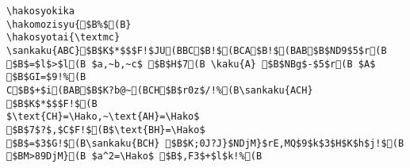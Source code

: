 \begin{verbatim}
\hakosyokika
\hakomozisyu{$B%$(B}
\hakosyotai{\textmc}
\sankaku{ABC}$B$K$*$$$F!$JU(BBC$B!$(BCA$B!$(BAB$B$ND9$5$r(B
$B$=$l$>$l(B $a,~b,~c$ $B$H$7(B \kaku{A} $B$NBg$-$5$r(B $A$ $B$GI=$9!%(B
C$B$+$i(BAB$B$K?b@~(BCH$B$r0z$/!%(B\sankaku{ACH} $B$K$*$$$F!$(B
$\text{CH}=\Hako,~\text{AH}=\Hako$ 
$B$7$?$,$C$F!$(B$\text{BH}=\Hako$
$B$=$3$G!$(B\sankaku{BCH} $B$K;0J?J}$NDjM}$rE,MQ$9$k$3$H$K$h$j!$(B
$BM>89DjM}(B $a^2=\Hako$ $B$,F3$+$l$k!%(B
\end{verbatim}
